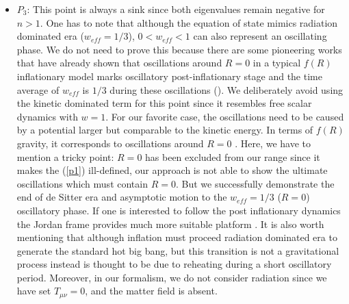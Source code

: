 \documentclass[a4paper,11pt]{article}
\begin{document}
\begin{itemize}
\item  $P_3$: This point is always a sink since both eigenvalues remain negative for $n>1$.  One has to note that although the equation of state mimics radiation dominated era ($w_{eff}=1/3$),  $0<w_{eff}<1$ can also represent an oscillating phase. We do not need to prove this because there are some pioneering works that have already shown that oscillations around $R=0$ in a typical $f(R)$ inflationary model marks oscillatory post-inflationary stage and the time average of $w_{eff}$ is $1/3$ during these oscillations (\cite{nons,Vilen,Mijic}). We deliberately avoid using the kinetic dominated term for this point since it resembles free scalar dynamics with $w=1$. For our favorite case, the oscillations need to be caused by a potential larger but comparable to the kinetic energy. In terms of $f(R)$ gravity, it corresponds to oscillations around $R=0$ \cite{nons,Vilen,Mijic,fel}. Here, we have to mention a tricky point: $R=0$ has been excluded from our range since it makes the (\ref{p1}) ill-defined, our approach is not able to show the ultimate oscillations which must contain $R=0$. But we successfully demonstrate the end of de Sitter era and asymptotic motion to the $w_{eff}=1/3$ ($R=0$) oscillatory phase. If one is interested to follow the post inflationary dynamics the Jordan frame provides much more suitable platform \cite{fel}. It is also worth mentioning that although inflation must proceed radiation dominated era to generate the standard hot big bang, but this transition is not a gravitational process instead is thought to be due to reheating during a short oscillatory period. Moreover, in our formalism, we do not consider radiation since we have set $T_{\mu\nu}=0$, and the matter field is absent. 
\end{itemize}
\end{document}
